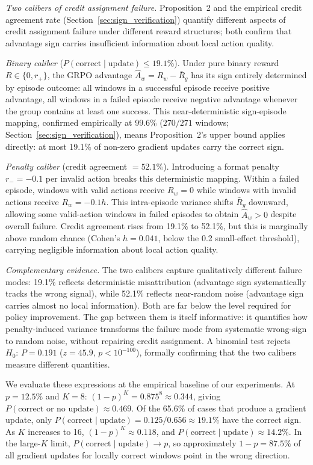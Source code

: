 \label{app:nonbinary_extension}
\textit{Two calibers of credit assignment failure.} Proposition~2 and the empirical credit agreement rate (Section~\ref{sec:sign_verification}) quantify different aspects of credit assignment failure under different reward structures; both confirm that advantage sign carries insufficient information about local action quality.

\textit{Binary caliber} ($P(\text{correct} \mid \text{update}) \leq 19.1\%$). Under pure binary reward $R \in \{0, r_+\}$, the GRPO advantage $\hat{A}_w = R_w - \bar{R}_g$ has its sign entirely determined by episode outcome: all windows in a successful episode receive positive advantage, all windows in a failed episode receive negative advantage whenever the group contains at least one success. This near-deterministic sign-episode mapping, confirmed empirically at 99.6\% ($270/271$ windows; Section~\ref{sec:sign_verification}), means Proposition~2's upper bound applies directly: at most 19.1\% of non-zero gradient updates carry the correct sign.

\textit{Penalty caliber} (credit agreement $= 52.1\%$). Introducing a format penalty $r_- = -0.1$ per invalid action breaks this deterministic mapping. Within a failed episode, windows with valid actions receive $R_w = 0$ while windows with invalid actions receive $R_w = -0.1h$. This intra-episode variance shifts $\bar{R}_g$ downward, allowing some valid-action windows in failed episodes to obtain $\hat{A}_w > 0$ despite overall failure. Credit agreement rises from 19.1\% to 52.1\%, but this is marginally above random chance (Cohen's $h = 0.041$, below the 0.2 small-effect threshold), carrying negligible information about local action quality.

\textit{Complementary evidence.} The two calibers capture qualitatively different failure modes: 19.1\% reflects deterministic misattribution (advantage sign systematically tracks the wrong signal), while 52.1\% reflects near-random noise (advantage sign carries almost no local information). Both are far below the level required for policy improvement. The gap between them is itself informative: it quantifies how penalty-induced variance transforms the failure mode from systematic wrong-sign to random noise, without repairing credit assignment. A binomial test rejects $H_0{:}\, P = 0.191$ ($z = 45.9$, $p < 10^{-100}$), formally confirming that the two calibers measure different quantities.

We evaluate these expressions at the empirical baseline of our experiments. At $p = 12.5\%$ and $K = 8$: $(1-p)^K = 0.875^8 \approx 0.344$, giving $P(\text{correct or no update}) \approx 0.469$. Of the 65.6\% of cases that produce a gradient update, only $P(\text{correct} \mid \text{update}) = 0.125 / 0.656 \approx 19.1\%$ have the correct sign. As $K$ increases to 16, $(1-p)^{K} \approx 0.118$, and $P(\text{correct} \mid \text{update}) \approx 14.2\%$. In the large-$K$ limit, $P(\text{correct} \mid \text{update}) \to p$, so approximately $1 - p = 87.5\%$ of all gradient updates for locally correct windows point in the wrong direction.

